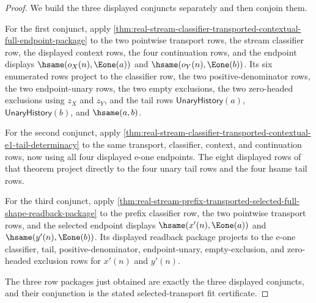\begin{proof}
We build the three displayed conjuncts separately and then conjoin them.

For the first conjunct, apply
\autoref{thm:real-stream-classifier-transported-contextual-full-endpoint-package}
to the two pointwise transport rows, the stream classifier row, the displayed
context rows, the four continuation rows, and the endpoint displays
$\hsame(o_X(n),\Eone(a))$ and $\hsame(o_Y(n),\Eone(b))$. Its six enumerated
rows project to the classifier row, the two positive-denominator rows, the two
endpoint-unary rows, the two empty exclusions, the two zero-headed exclusions
using $z_X$ and $z_Y$, and the tail rows
$\mathsf{UnaryHistory}(a)$, $\mathsf{UnaryHistory}(b)$, and $\hsame(a,b)$.

For the second conjunct, apply
\autoref{thm:real-stream-classifier-transported-contextual-e1-tail-determinacy}
to the same transport, classifier, context, and continuation rows, now using
all four displayed e-one endpoints. The eight displayed rows of that theorem
project directly to the four unary tail rows and the four hsame tail rows.

For the third conjunct, apply
\autoref{thm:real-stream-prefix-transported-selected-full-shape-readback-package}
to the prefix classifier row, the two pointwise transport rows, and the selected
endpoint displays $\hsame(x'(n),\Eone(a))$ and
$\hsame(y'(n),\Eone(b))$. Its displayed readback package projects to the
e-one classifier, tail, positive-denominator, endpoint-unary, empty-exclusion,
and zero-headed exclusion rows for $x'(n)$ and $y'(n)$.

The three row packages just obtained are exactly the three displayed
conjuncts, and their conjunction is the stated selected-transport fit
certificate.
\end{proof}

